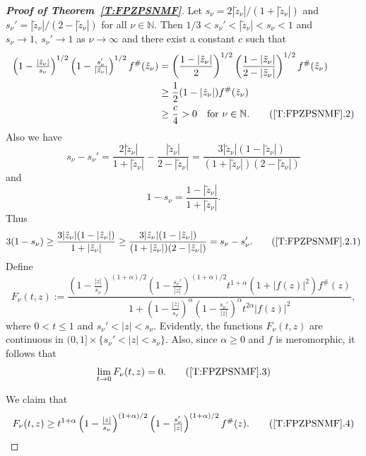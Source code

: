 \documentclass[11pt, reqno]{amsart}
\theoremstyle{definition}
\theoremstyle{remark}
\numberwithin{equation}{section}
\begin{document}
\begin{proof}[{\bf Proof of Theorem~\ref{T:FPZPSNMF}}]
Let $s_{\nu}=2|\tilde{z}_{\nu}|/(1+|\tilde{z}_{\nu}|)$ and $s_{\nu}'=|\tilde{z}_{\nu}|/(2-|\tilde{z}_{\nu}|)$ for all $\nu\in\mathbb N$. Then 
$1/3<s_{\nu}'<|\tilde{z}_{\nu}|<s_{\nu}<1$ and $s_{\nu}\to 1,\ s_{\nu}'\to 1$ as $\nu\to \infty$ and there exist a constant $c$ such that
\begin{align*}
\left(1-\tfrac{|\tilde{z}_{\nu}|}{s_{\nu}}\right)^{1/2} \left(1-\tfrac{s_{\nu}'}{|\tilde{z}_{\nu}|}\right)^{1/2} f^{\#}(\tilde{z}_{\nu})&= \left(\frac{1-|\tilde{z}_{\nu}|}{2}\right)^{1/2} \left(\frac{1-|\tilde{z}_{\nu}|}{2-|\tilde{z}_{\nu}|}\right)^{1/2} f^\#(\tilde{z}_{\nu}) \\
&\geq \frac{1}{2}(1-|\tilde{z}_{\nu}|)f^\#(\tilde{z}_{\nu})\\ &\geq \frac{c}{4}>0 \quad \text{for } \nu \in\mathbb N .
\tag{\ref*{T:FPZPSNMF}.2}\label{SNMF.2}
\end{align*}
Also we have
\begin{equation*}s_{\nu}-s_{\nu}'=\frac{2|\tilde{z}_{\nu}|}{1+|\tilde{z}_{\nu}|}-\frac{|\tilde{z}_{\nu}|}{2-|\tilde{z}_{\nu}|}=\frac{3|\tilde{z}_{\nu}|(1-|\tilde{z}_{\nu}|)}{(1+|\tilde{z}_{\nu}|)(2-|\tilde{z}_{\nu}|)}\end{equation*} and \begin{equation*}1-s_{\nu}=\frac{1-|\tilde{z}_{\nu}|}{1+|\tilde{z}_{\nu}|}.\end{equation*}
Thus
\begin{align*}
3(1-s_{\nu})\geq\frac{3|\tilde{z}_{\nu}|(1-|\tilde{z}_{\nu}|)}{1+|\tilde{z}_{\nu}|}\geq \frac{3|\tilde{z}_{\nu}|(1-|\tilde{z}_{\nu}|)}{(1+|\tilde{z}_{\nu}|)(2-|\tilde{z}_{\nu}|)}=s_{\nu}-s_{\nu}'.\tag{\ref*{T:FPZPSNMF}.2.1}\label{SNMF.2.1} \end{align*} 
Define
\begin{equation*}
F_{\nu}(t,z)
:=
\dfrac{\left(1-\frac{|z|}{s_{\nu}}\right)^{(1+\alpha)/2} \left(1-\frac{s_{\nu}'}{|z|}\right)^{(1+\alpha)/2}
t^{1+\alpha} (1+|f(z)|^{2}) f^{\#}(z)}
{1+\left(1-\frac{|z|}{s_{\nu}}\right)^{\alpha} \left(1-\frac{s_{\nu}'}{|z|}\right)^{\alpha} t^{2\alpha} |f(z)|^{2}},
\end{equation*}
where $0<t\le1$ and $s_{\nu}'<|z|<s_{\nu}$. Evidently, the functions $F_{\nu}(t,z)$ are continuous
in $(0,1]\times\{s_{\nu}'<|z|<s_{\nu}\}$. Also, since $\alpha\geq0$ and $f$ is meromorphic, it follows that
\begin{equation}
\lim_{t\to 0} F_{\nu}(t,z)=0 .
\tag{\ref*{T:FPZPSNMF}.3} \label{SNMF.3}
\end{equation}

We claim that
\begin{equation}
F_{\nu}(t,z)
\ge
t^{1+\alpha}
\left(1-\tfrac{|z|}{s_{\nu}}\right)^{(1+\alpha)/2} \left(1-\tfrac{s_{\nu}'}{|z|}\right)^{(1+\alpha)/2}
f^{\#}(z).
\tag{\ref*{T:FPZPSNMF}.4} \label{SNMF.4}
\end{equation}


\end{proof}
\end{document}
